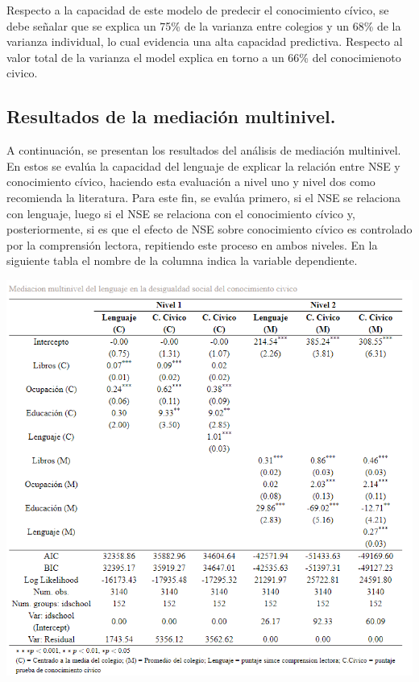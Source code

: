 \documentclass[12pt,twoside]{templates/facsothesis}
\begin{document}
Respecto a la capacidad de este modelo de predecir el conocimiento cívico, se debe señalar que se explica un 75\% de la varianza entre colegios y un 68\% de la varianza individual, lo cual evidencia una alta capacidad predictiva. Respecto al valor total de la varianza el model explica en torno a un 66\% del conocimienoto civico.

\hypertarget{resultados-de-la-mediaciuxf3n-multinivel.}{%
\subsection{Resultados de la mediación multinivel.}\label{resultados-de-la-mediaciuxf3n-multinivel.}}

A continuación, se presentan los resultados del análisis de mediación multinivel. En estos se evalúa la capacidad del lenguaje de explicar la relación entre NSE y conocimiento cívico, haciendo esta evaluación a nivel uno y nivel dos como recomienda la literatura. Para este fin, se evalúa primero, si el NSE se relaciona con lenguaje, luego si el NSE se relaciona con el conocimiento cívico y, posteriormente, si es que el efecto de NSE sobre conocimiento cívico es controlado por la comprensión lectora, repitiendo este proceso en ambos niveles. En la siguiente tabla el nombre de la columna indica la variable dependiente.

\begin{center}\includegraphics[width=0.8\linewidth]{images/Mediacion_n1n2} \end{center}
\end{document}
